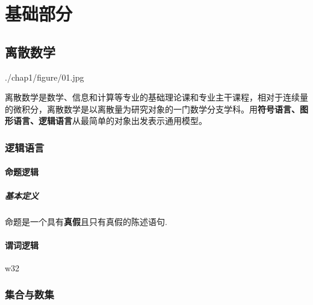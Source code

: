 \documentclass[12pt, a4paper, oneside, UTF8]{ctexbook}
\begin{document}
	\else
	\fi
		\part{基础部分}
	
	\chapter{离散数学}
\begin{leftthreeimage}[0.28\textwidth]{./chap1/figure/01.jpg}
	\caption{\color{red} 前言}  %
	\label{fig:leftimage1}  %
	离散数学是数学、信息和计算等专业的基础理论课和专业主干课程，相对于连续量的微积分，离散数学是以离散量为研究对象的一门数学分支学科。用\textbf{符号语言、图形语言、逻辑语言}从最简单的对象出发表示通用模型。
\end{leftthreeimage}
	\section{逻辑语言}
		\subsection{命题逻辑}
			\subsubsection*{基本定义}
	\begin{change}
		\item  命题是一个具有\textbf{真假}且只有真假的陈述语句.
	\end{change}


		\subsection{谓词逻辑} 
		
	w32
	
	\section{集合与数集}
	
	\ifx\allfiles\undefined
\end{document}
